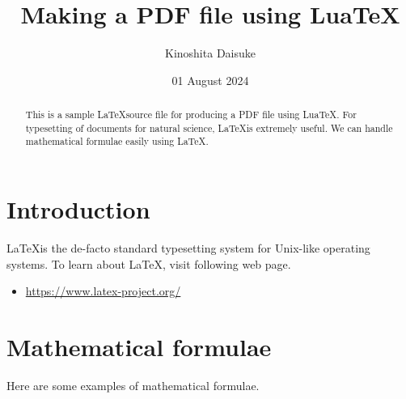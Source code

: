 \documentclass{article}
\title{\bf Making a PDF file using Lua\TeX}
\author{{\sc Kinoshita} Daisuke}
\date{01 August 2024}
\begin{document}
\maketitle

\begin{abstract}
 This is a sample \LaTeX source file for producing a PDF file using
 Lua\TeX. For typesetting of documents for natural science, \LaTeX is
 extremely useful. We can handle mathematical formulae easily using
 \LaTeX.
\end{abstract}

 \section{Introduction}

 \LaTeX is the de-facto standard typesetting system for Unix-like
 operating systems. To learn about \LaTeX, visit following web page.

 \begin{itemize}
  \item \url{https://www.latex-project.org/}
 \end{itemize}

 \section{Mathematical formulae}

 Here are some examples of mathematical formulae.
\end{document}
